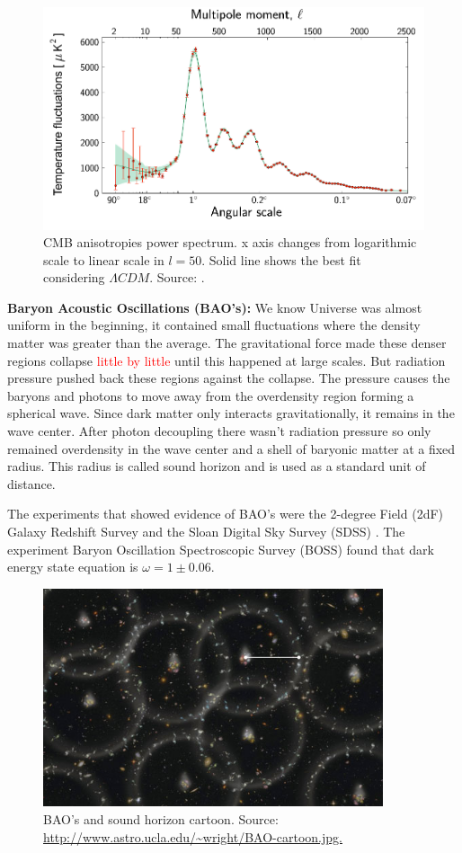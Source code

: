 \documentclass[onecolumn,           %
               showpacs,            %
               preprintnumbers,     %
               aps,                 %
               prl,          	    %
               letterpaper,             %
               superscriptaddress,      %
               nofootinbib,         %
               tightenlines,        %
               floats,floatfix      %
               ,usenatbib,
               ]{revtex4-1}
\begin{document}
\begin{figure}[h]
	\centering
	\includegraphics[width=12cm]{FiguresCosmo/espectro_temperatura_CMB.png}	
	\caption{CMB anisotropies power spectrum. x axis changes from logarithmic scale to linear scale in $l = 50$. Solid line shows the best fit considering $\Lambda CDM$. Source: \cite{parametros}.}
	\label{CMBgraf} 
\end{figure}

\textbf{Baryon Acoustic Oscillations (BAO's):} We know Universe was almost uniform in the beginning, it contained small fluctuations where the density matter was greater than the average. The gravitational force made these denser regions collapse \textcolor{red}{little by little} until this happened at large scales. But radiation pressure pushed back these regions against the collapse. The pressure causes the baryons and photons to move away from the overdensity region forming a spherical wave. Since dark matter only interacts gravitationally, it remains in the wave center. After photon decoupling there wasn't radiation pressure so only remained overdensity in the wave center and a shell of baryonic matter at a fixed radius. This radius is called sound horizon and is used as a standard unit of distance.

The experiments that showed evidence of BAO's were the 2-degree Field (2dF) Galaxy Redshift Survey \cite{BAO3} and the Sloan Digital Sky Survey (SDSS) \cite{BAO4}. The experiment Baryon Oscillation Spectroscopic Survey (BOSS) found that dark energy state equation is $\omega = 1 \pm 0.06$.

\begin{figure}[h]
	\centering
	\includegraphics[width=10cm]{FiguresCosmo/BAO_cartoon.jpg}	
	\caption{BAO's and sound horizon cartoon. Source: \url{http://www.astro.ucla.edu/~wright/BAO-cartoon.jpg.}}
\end{figure}
\end{document}
